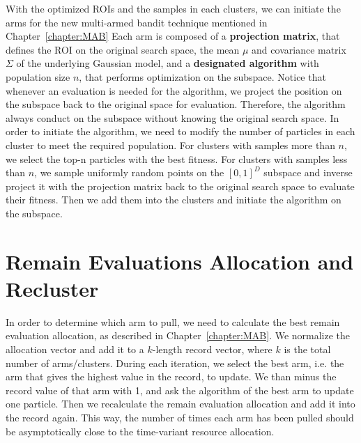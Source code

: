 With the optimized ROIs and the samples in each clusters, 
we can initiate the arms for the new multi-armed bandit technique mentioned in Chapter~\ref{chapter:MAB}
Each arm is composed of a \textbf{projection matrix}, that defines the ROI on the original search space,
the mean $\mu$ and covariance matrix $\Sigma$ of the underlying Gaussian model,
and a \textbf{designated algorithm} with population size $n$, that performs optimization on the subspace.
Notice that whenever an evaluation is needed for the algorithm, we project the position on the subspace back to the original space for evaluation.
Therefore, the algorithm always conduct on the subspace without knowing the original search space.
In order to initiate the algorithm, we need to modify the number of particles in each cluster to meet the required population.
For clusters with samples more than $n$, we select the top-n particles with the best fitness.
For clusters with samples less than $n$, we sample uniformly random points on the $[0,1]^D$ subspace and inverse project it with the projection matrix back to the original search space to evaluate their fitness.
Then we add them into the clusters and initiate the algorithm on the subspace.


\section{Remain Evaluations Allocation and Recluster}

In order to determine which arm to pull, we need to calculate the best remain evaluation allocation, as described in Chapter~\ref{chapter:MAB}.
We normalize the allocation vector and add it to a $k$-length record vector, where $k$ is the total number of arms/clusters.  
During each iteration, we select the best arm, i.e. the arm that gives the highest value in the record, to update.
We than minus the record value of that arm with 1, and ask the algorithm of the best arm to update one particle.
Then we recalculate the remain evaluation allocation and add it into the record again.
This way, the number of times each arm has been pulled should be asymptotically close to the time-variant resource allocation.

